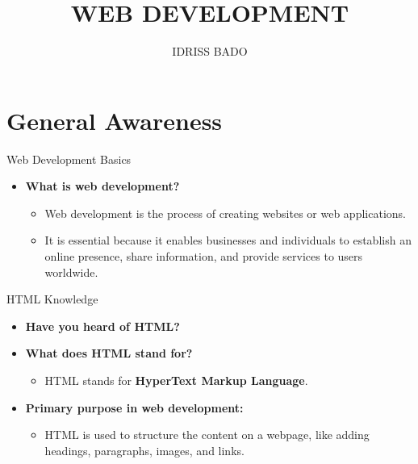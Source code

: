 \documentclass{beamer}
\title{WEB DEVELOPMENT}
\author{IDRISS BADO }
\date{}
\begin{document}
\begin{frame}
    \titlepage
\end{frame}

\section{General Awareness}
\begin{frame}{Web Development Basics}
    \begin{itemize}
        \item \textbf{What is web development?}
        \begin{itemize}
            \item Web development is the process of creating websites or web applications.
            \item It is essential because it enables businesses and individuals to establish an online presence, share information, and provide services to users worldwide.
        \end{itemize}
    \end{itemize}
\end{frame}

\begin{frame}{HTML Knowledge}
    \begin{itemize}
        \item \textbf{Have you heard of HTML?}
        \item \textbf{What does HTML stand for?}
        \begin{itemize}
            \item HTML stands for \textbf{HyperText Markup Language}.
        \end{itemize}
        \item \textbf{Primary purpose in web development:}
        \begin{itemize}
            \item HTML is used to structure the content on a webpage, like adding headings, paragraphs, images, and links.
        \end{itemize}
    \end{itemize}
\end{frame}

\end{document}
